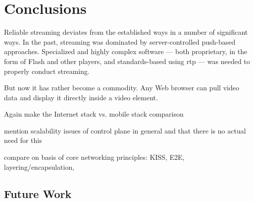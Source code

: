 \chapter{Conclusions}
\label{chap:conclusion}

Reliable streaming deviates from the established ways in a number of significant ways. In the past, streaming was dominated by server-controlled push-based approaches. Specialized and highly complex software --- both proprietary, in the form of Flash and other players, and standards-based using \gls{rtp} --- was needed to properly conduct streaming.

But now it has rather become a commodity. Any Web browser can pull video data and display it directly inside a video element.



Again make the Internet stack vs. mobile stack comparison

mention scalability issues of control plane in general and that there is no actual need for this

compare on basis of core networking principles: KISS, E2E, layering/encapsulation, 





\section{Future Work}

